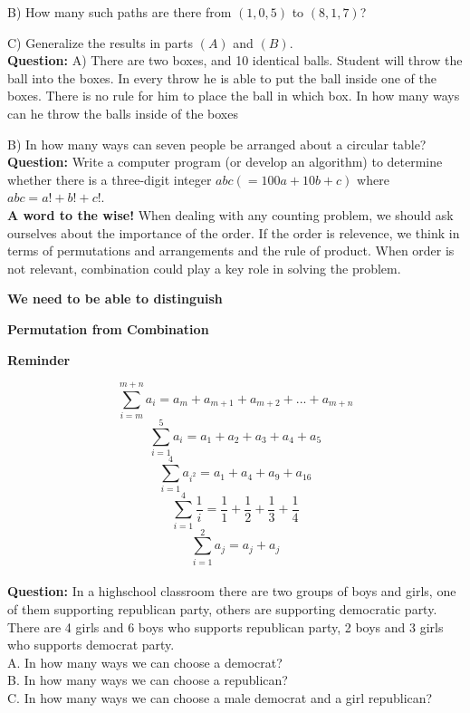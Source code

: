 \documentclass[11pt]{article}
\begin{document}
B) How many such paths are there from $(1,0,5)$ to $(8,1,7)$?

C) Generalize the results in parts $(A)$ and $(B)$.
\\

\textbf{Question:} A) There are two boxes, and 10 identical balls. Student will throw the ball into the boxes. In every throw he is able to put the ball inside one of the boxes. There is no rule for him to place the ball in which box. In how many ways can he throw the balls inside of the boxes %

B) In how many ways can seven people be arranged about a circular table?
\\

\textbf{Question:}  Write a computer program (or develop an algorithm) to determine whether there is a three-digit integer $abc (= 100a + 10b + c)$ where $abc = a! + b! + c!$.
\\ %

\textbf{A word to the wise!} When dealing with any counting problem, we should ask ourselves about the importance of the order. If the order is relevence, we think in terms of permutations and arrangements and the rule of product. When order is not relevant, combination could play a key role in solving the problem.
\\

\begin{center}
\textbf{We need to be able to distinguish}

\textbf{Permutation from Combination}
\end{center}


\begin{center}
\textbf{Reminder}
\end{center}

$$\sum\limits_{i = m}^{m+n}{a_i = a_m+a_{m+1}+a_{m+2}+...+a_{m+n}}$$
$$\sum\limits_{i = 1}^5{a_i = a_1+a_2+a_3+a_4+a_5}$$
$$\sum\limits_{i = 1}^4{a_{i^2} = a_1+a_4+a_9+a_{16}}$$
$$\sum\limits_{i = 1}^4{\frac{1}{i} =\frac{1}{1}+\frac{1}{2}+\frac{1}{3}+\frac{1}{4}}$$
$$\sum\limits_{i = 1}^2{a_j = a_j+a_j}$$
\\

\textbf{Question:} In a highschool classroom there are two groups of boys and girls, one of them supporting republican party, others are supporting democratic party. There are 4 girls and 6 boys who supports republican party, 2 boys and 3 girls who supports democrat party.\\ %
A. In how many ways we can choose a democrat?\\
B. In how many ways we can choose a republican?\\
C. In how many ways we can choose a male democrat and a girl republican?\\
\\
\end{document}
